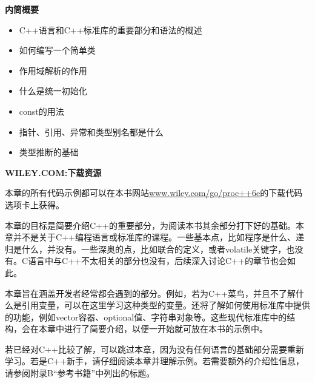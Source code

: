 
\noindent
\textbf{内筒概要}

\begin{itemize}
\item
C++语言和C++标准库的重要部分和语法的概述

\item
如何编写一个简单类

\item
作用域解析的作用

\item
什么是统一初始化

\item
const的用法

\item
指针、引用、异常和类型别名都是什么

\item
类型推断的基础
\end{itemize}

\noindent
\textbf{WILEY.COM:下载资源}

本章的所有代码示例都可以在本书网站\url{www.wiley.com/go/proc++6e}的下载代码选项卡上获得。

本章的目标是简要介绍C++的重要部分，为阅读本书其余部分打下好的基础。本章并不是关于C++编程语言或标准库的课程。一些基本点，比如程序是什么、递归是什么，并没有。一些深奥的点，比如联合的定义，或者volatile关键字，也没有。C语言中与C++不太相关的部分也没有，后续深入讨论C++的章节也会如此。

本章旨在涵盖开发者经常都会遇到的部分。例如，若为C++菜鸟，并且不了解什么是引用变量，可以在这里学习这种类型的变量。还将了解如何使用标准库中提供的功能，例如vector容器、optional值、字符串对象等。这些现代标准库中的结构，会在本章中进行了简要介绍，以便一开始就可放在本书的示例中。

若已经对C++比较了解，可以跳过本章，因为没有任何语言的基础部分需要重新学习。若是C++新手，请仔细阅读本章并理解示例。若需要额外的介绍性信息，请参阅附录B“参考书籍”中列出的标题。








